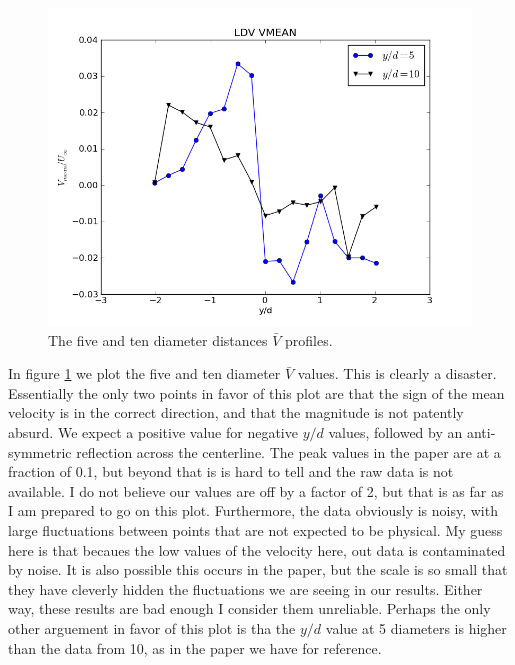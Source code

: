 \documentclass{article}
\begin{document}
\begin{figure}[!htb]
 \begin{center}
  \includegraphics[width = 12 cm]{figs/vmean}
  \caption{The five and ten diameter distances $\bar V$ profiles. }
  \label{vmean}
 \end{center}
\end{figure}

In figure \ref{vmean} we plot the five and ten diameter $\bar V$ values. This is clearly a disaster. 
Essentially the only two points in favor of this plot are that the sign of the mean velocity is in the 
correct direction, and that the magnitude is not patently absurd. We expect a positive value for 
negative $y/d$ values, followed by an anti-symmetric reflection across the centerline. The peak values in the paper
are at a fraction of 0.1, but beyond that is is hard to tell and the raw data is not available. I do not 
believe our values are off by a factor of 2, but that is as far as I am prepared to go on this plot. Furthermore, the data
obviously is noisy, with large fluctuations between points that are not expected to be physical. My guess here is that
becaues the low values of the velocity here, out data is contaminated by noise. It is also possible this occurs in the 
paper, but the scale is so small that they have cleverly hidden the fluctuations we are seeing in our results. Either way, 
these results are bad enough I consider them unreliable. Perhaps the only other arguement in favor of this plot is tha
the $y/d$ value at 5 diameters is higher than the data from 10, as in the paper we have for reference. 
\end{document}
